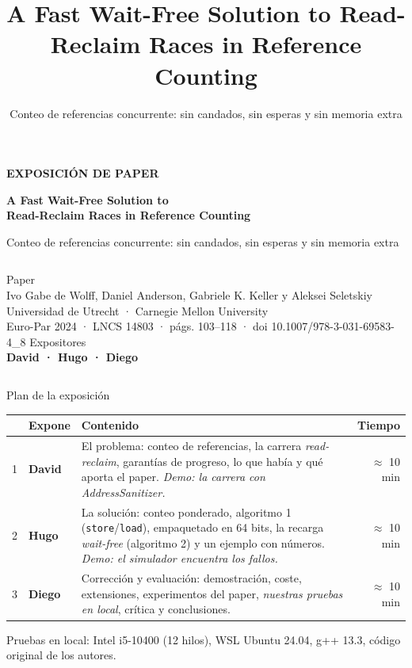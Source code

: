 \documentclass[aspectratio=169,11pt]{beamer}
\title{A Fast Wait-Free Solution to Read-Reclaim Races in Reference Counting}
\subtitle{Conteo de referencias concurrente: sin candados, sin esperas y sin memoria extra}
\date{}
\begin{document}
{
\begin{frame}[plain]
  \vspace*{6mm}
  {\color{acento}\small\bfseries EXPOSICIÓN DE PAPER}\par\smallskip
  {\fontsize{24}{28}\selectfont\bfseries A Fast Wait-Free Solution to\\ Read-Reclaim Races in Reference Counting\par}
  \medskip
  {\large\color{gris}Conteo de referencias concurrente: sin candados, sin esperas y sin memoria extra\par}
  \vfill
  \begin{columns}[T]
    {\small\color{gris}Paper}\\
    Ivo Gabe de Wolff, Daniel Anderson, Gabriele K. Keller y Aleksei Seletskiy\\
    {\small Universidad de Utrecht · Carnegie Mellon University}\\
    {\small Euro-Par 2024 · LNCS 14803 · págs. 103–118 · doi 10.1007/978-3-031-69583-4\_8}
    {\small\color{gris}Expositores}\\[2pt]
    {\large\bfseries David · Hugo · Diego}
  \end{columns}
  \vspace*{4mm}
\end{frame}}

\begin{frame}{Plan de la exposición}
  \renewcommand{\arraystretch}{1.2}\small
  \begin{tabularx}{\linewidth}{@{}l l X r@{}}
    \toprule
    & \textbf{Expone} & \textbf{Contenido} & \textbf{Tiempo}\\
    \midrule
    1 & \textbf{David} & El problema: conteo de referencias, la carrera \emph{read-reclaim}, garantías de progreso, lo que había y qué aporta el paper. \emph{Demo: la carrera con AddressSanitizer.} & $\approx$ 10 min\\
    2 & \textbf{Hugo} & La solución: conteo ponderado, algoritmo 1 (\texttt{store}/\texttt{load}), empaquetado en 64 bits, la recarga \emph{wait-free} (algoritmo 2) y un ejemplo con números. \emph{Demo: el simulador encuentra los fallos.} & $\approx$ 10 min\\
    3 & \textbf{Diego} & Corrección y evaluación: demostración, coste, extensiones, experimentos del paper, \emph{nuestras pruebas en local}, crítica y conclusiones. & $\approx$ 10 min\\
    \bottomrule
  \end{tabularx}
  \vfill
  {\footnotesize\color{gris}Pruebas en local: Intel i5-10400 (12 hilos), WSL Ubuntu 24.04, g++ 13.3, código original de los autores.}
\end{frame}
\end{document}
